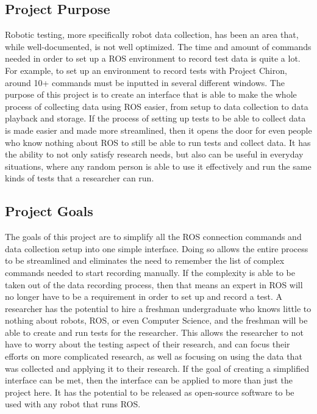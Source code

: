 \documentclass[onecolumn, draftclsnofoot,10pt, compsoc]{IEEEtran}
\begin{document}
\subsection{Project Purpose}
Robotic testing, more specifically robot data collection, has been an area that, while well-documented, is not well optimized. The time and amount of commands needed in order to set up a ROS environment to record test data is quite a lot. For example, to set up an environment to record tests with Project Chiron, around 10+ commands must be inputted in several different windows. The purpose of this project is to create an interface that is able to make the whole process of collecting data using ROS easier, from setup to data collection to data playback and storage. If the process of setting up tests to be able to collect data is made easier and made more streamlined, then it opens the door for even people who know nothing about ROS to still be able to run tests and collect data. It has the ability to not only satisfy research needs, but also can be useful in everyday situations, where any random person is able to use it effectively and run the same kinds of tests that a researcher can run.
\subsection{Project Goals}
The goals of this project are to simplify all the ROS connection commands and data collection setup into one simple interface. Doing so allows the entire process to be streamlined and eliminates the need to remember the list of complex commands needed to start recording manually. If the complexity is able to be taken out of the data recording process, then that means an expert in ROS will no longer have to be a requirement in order to set up and record a test. A researcher has the potential to hire a freshman undergraduate who knows little to nothing about robots, ROS, or even Computer Science, and the freshman will be able to create and run tests for the researcher. This allows the researcher to not have to worry about the testing aspect of their research, and can focus their efforts on more complicated research, as well as focusing on using the data that was collected and applying it to their research. If the goal of creating a simplified interface can be met, then the interface can be applied to more than just the project here. It has the potential to be released as open-source software to be used with any robot that runs ROS.
\end{document}
